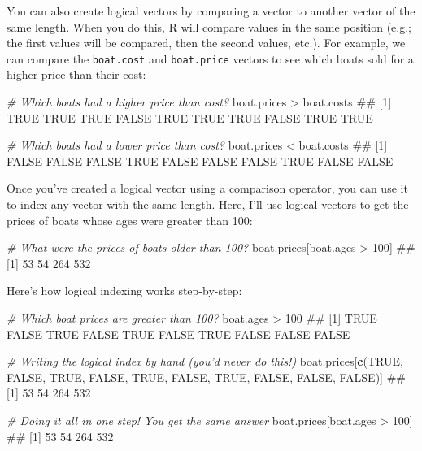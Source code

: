 \documentclass[]{book}
\newenvironment{Shaded}{\begin{snugshade}}{\end{snugshade}}
\newcommand{\KeywordTok}[1]{\textcolor[rgb]{0.13,0.29,0.53}{\textbf{{#1}}}}
\newcommand{\DecValTok}[1]{\textcolor[rgb]{0.00,0.00,0.81}{{#1}}}
\newcommand{\StringTok}[1]{\textcolor[rgb]{0.31,0.60,0.02}{{#1}}}
\newcommand{\CommentTok}[1]{\textcolor[rgb]{0.56,0.35,0.01}{\textit{{#1}}}}
\newcommand{\OtherTok}[1]{\textcolor[rgb]{0.56,0.35,0.01}{{#1}}}
\newcommand{\NormalTok}[1]{{#1}}
\theoremstyle{definition}
\theoremstyle{definition}
\theoremstyle{remark}
\begin{document}
You can also create logical vectors by comparing a vector to another
vector of the same length. When you do this, R will compare values in
the same position (e.g.; the first values will be compared, then the
second values, etc.). For example, we can compare the \texttt{boat.cost}
and \texttt{boat.price} vectors to see which boats sold for a higher
price than their cost:

\begin{Shaded}
\begin{Highlighting}[]
\CommentTok{# Which boats had a higher price than cost?}
\NormalTok{boat.prices >}\StringTok{ }\NormalTok{boat.costs}
\NormalTok{##  [1]  TRUE  TRUE  TRUE FALSE  TRUE  TRUE  TRUE FALSE  TRUE  TRUE}

\CommentTok{# Which boats had a lower price than cost?}
\NormalTok{boat.prices <}\StringTok{ }\NormalTok{boat.costs}
\NormalTok{##  [1] FALSE FALSE FALSE  TRUE FALSE FALSE FALSE  TRUE FALSE FALSE}
\end{Highlighting}
\end{Shaded}

Once you've created a logical vector using a comparison operator, you
can use it to index any vector with the same length. Here, I'll use
logical vectors to get the prices of boats whose ages were greater than
100:

\begin{Shaded}
\begin{Highlighting}[]
\CommentTok{# What were the prices of boats older than 100?}
\NormalTok{boat.prices[boat.ages >}\StringTok{ }\DecValTok{100}\NormalTok{]}
\NormalTok{## [1]  53  54 264 532}
\end{Highlighting}
\end{Shaded}

Here's how logical indexing works step-by-step:

\begin{Shaded}
\begin{Highlighting}[]
\CommentTok{# Which boat prices are greater than 100?}
\NormalTok{boat.ages >}\StringTok{ }\DecValTok{100}
\NormalTok{##  [1]  TRUE FALSE  TRUE FALSE  TRUE FALSE  TRUE FALSE FALSE FALSE}

\CommentTok{# Writing the logical index by hand (you'd never do this!)}
\NormalTok{boat.prices[}\KeywordTok{c}\NormalTok{(}\OtherTok{TRUE}\NormalTok{, }\OtherTok{FALSE}\NormalTok{, }\OtherTok{TRUE}\NormalTok{, }\OtherTok{FALSE}\NormalTok{, }\OtherTok{TRUE}\NormalTok{, }\OtherTok{FALSE}\NormalTok{, }\OtherTok{TRUE}\NormalTok{, }\OtherTok{FALSE}\NormalTok{, }\OtherTok{FALSE}\NormalTok{, }\OtherTok{FALSE}\NormalTok{)]}
\NormalTok{## [1]  53  54 264 532}

\CommentTok{# Doing it all in one step! You get the same answer}
\NormalTok{boat.prices[boat.ages >}\StringTok{ }\DecValTok{100}\NormalTok{]}
\NormalTok{## [1]  53  54 264 532}
\end{Highlighting}
\end{Shaded}
\end{document}
